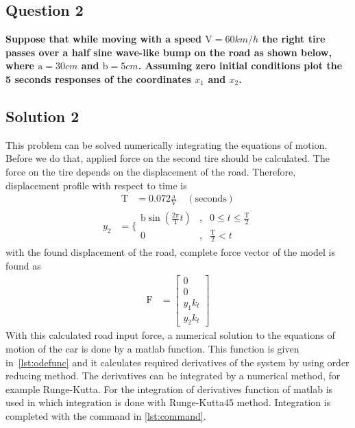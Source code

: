 \documentclass[]{report}
\begin{document}
\subsection*{Question 2}
\textbf{Suppose that while moving with a speed $\mathrm{V} = 60 km/h$ the right tire passes over a half sine wave-like bump on the road as shown below, where $\mathrm{a} = 30cm$ and $\mathrm{b} = 5cm$. Assuming zero initial conditions plot the 5 seconds responses of the coordinates $x_1$ and $x_2$.}
\begin{center}
\subsection*{Solution 2}
\end{center}
This problem can be solved numerically integrating the equations of motion. Before we do that, applied force on the second tire should be calculated. The force on the tire depends on the displacement of the road. Therefore, displacement profile with respect to time is
\begin{align*}
\mathrm{T}& =0.072\frac{\mathrm{a}}{\mathrm{V}}\quad \mathrm{(seconds)}
\end{align*}
\begin{align*}
y_2& =\{\begin{array}{clc}
\mathrm{b}\sin\left(\frac{2\pi}{\mathrm{T}}t\right) &,& 0\leq t \leq \frac{\mathrm{T}}{2} \\ 
0 &,& \frac{\mathrm{T}}{2}<t
\end{array}
\end{align*}
with the found displacement of the road, complete force vector of the model is found as
\begin{align*}
\mathrm{F}& =\left[\begin{array}{ccc}
0\\
0\\
y_1 k_t\\
y_2 k_t
\end{array}\right]
\end{align*}
With this calculated road input force, a numerical solution to the equations of motion of the car is done by a matlab function. This function is given in~\cref{lst:odefunc} and it calculates required derivatives of the system by using order reducing method. The derivatives can be integrated by a numerical method, for example Runge-Kutta. For the integration of derivatives  function of matlab is used in which integration is done with Runge-Kutta45 method. Integration is completed with the command in \cref{lst:command}.
\end{document}
